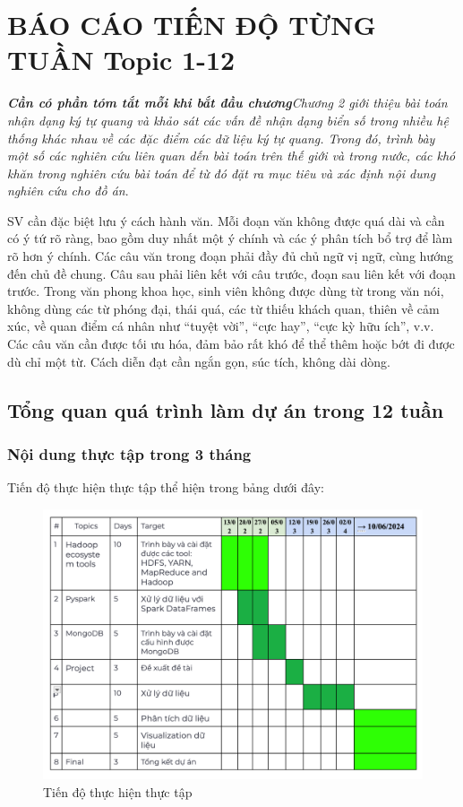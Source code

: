 \chapter{BÁO CÁO TIẾN ĐỘ TỪNG TUẦN Topic 1-12}
\textbf{\textit{Cần có phần tóm tắt mỗi khi bắt đầu chương}}\textit{Chương 2 giới thiệu bài toán nhận dạng ký tự quang và khảo sát các vấn đề nhận dạng biển số trong nhiều hệ thống khác nhau về các đặc điểm các dữ liệu ký tự quang. Trong đó, trình bày một số các nghiên cứu liên quan dến bài toán trên thế giới và trong nước, các khó khăn trong nghiên cứu bài toán để từ đó đặt ra mục tiêu và xác định nội dung nghiên cứu cho đồ án}.

\hspace{0.7cm}SV cần đặc biệt lưu ý cách hành văn. Mỗi đoạn văn không được quá dài và cần có ý tứ rõ ràng, bao gồm duy nhất một ý chính và các ý phân tích bổ trợ để làm rõ hơn ý chính. Các câu văn trong đoạn phải đầy đủ chủ ngữ vị ngữ, cùng hướng đến chủ đề chung. Câu sau phải liên kết với câu trước, đoạn sau liên kết với đoạn trước. Trong văn phong khoa học, sinh viên không được dùng từ trong văn nói, không dùng các từ phóng đại, thái quá, các từ thiếu khách quan, thiên về cảm xúc, về quan điểm cá nhân như “tuyệt vời”, “cực hay”, “cực kỳ hữu ích”, v.v. Các câu văn cần được tối ưu hóa, đảm bảo rất khó để thể thêm hoặc bớt đi được dù chỉ một từ. Cách diễn đạt cần ngắn gọn, súc tích, không dài dòng.

\section{Tổng quan quá trình làm dự án trong 12 tuần}
\subsection* {Nội dung thực tập trong 3 tháng }
Tiến độ thực hiện thực tập thể hiện trong bảng dưới đây:
\begin{figure}[h]
\centering
\includegraphics[width=1.0\linewidth]{Figures/Tiendo.png}
\caption {Tiến độ thực hiện thực tập}
\label{fig:iot}
\end{figure}

